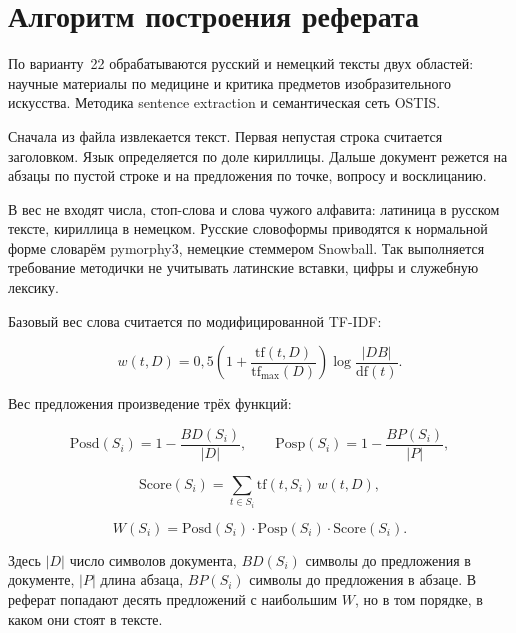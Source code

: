 \section{Алгоритм построения реферата}
\label{sec:algorithms}

По варианту~22 обрабатываются русский и немецкий тексты двух областей: научные материалы по медицине и критика предметов изобразительного искусства. Методика \mdash sentence extraction и семантическая сеть OSTIS.

Сначала из файла извлекается текст. Первая непустая строка считается заголовком. Язык определяется по доле кириллицы. Дальше документ режется на абзацы по пустой строке и на предложения по точке, вопросу и восклицанию.

В вес не входят числа, стоп-слова и слова чужого алфавита: латиница в русском тексте, кириллица в немецком. Русские словоформы приводятся к нормальной форме словарём pymorphy3, немецкие \mdash стеммером Snowball. Так выполняется требование методички не учитывать латинские вставки, цифры и служебную лексику.

Базовый вес слова считается по модифицированной TF-IDF:

\begin{equation}
w(t, D) = 0{,}5 \left(1 + \frac{\mathrm{tf}(t, D)}{\mathrm{tf}_{\max}(D)}\right) \log\frac{|DB|}{\mathrm{df}(t)}.
\end{equation}

Вес предложения \mdash произведение трёх функций:

\begin{equation}
\mathrm{Posd}(S_i) = 1 - \frac{BD(S_i)}{|D|}, \qquad
\mathrm{Posp}(S_i) = 1 - \frac{BP(S_i)}{|P|},
\end{equation}

\begin{equation}
\mathrm{Score}(S_i) = \sum_{t \in S_i} \mathrm{tf}(t, S_i)\, w(t, D),
\end{equation}

\begin{equation}
W(S_i) = \mathrm{Posd}(S_i) \cdot \mathrm{Posp}(S_i) \cdot \mathrm{Score}(S_i).
\end{equation}

Здесь $|D|$ \mdash число символов документа, $BD(S_i)$ \mdash символы до предложения в документе, $|P|$ \mdash длина абзаца, $BP(S_i)$ \mdash символы до предложения в абзаце. В реферат попадают десять предложений с наибольшим $W$, но в том порядке, в каком они стоят в тексте.


